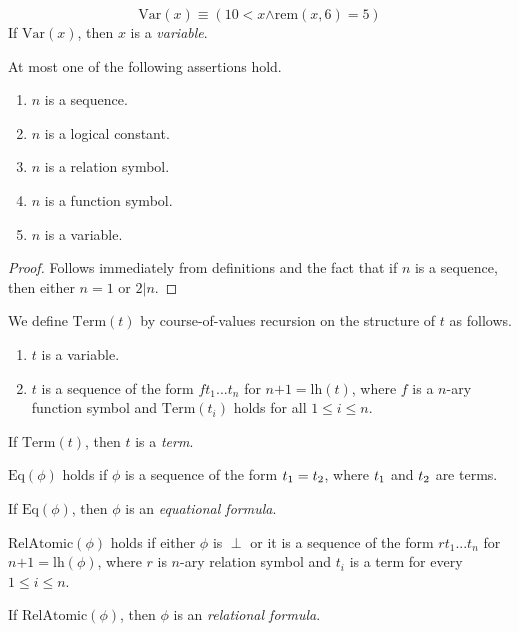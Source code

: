 \documentclass[10pt]{amsart}
\newcommand{\mand}{\boldsymbol{\wedge}}
\newcommand{\mle}{\boldsymbol{<}}
\newcommand{\mleq}{\boldsymbol{\leq}}
\newcommand{\meq}{\boldsymbol{=}}
\newcommand{\mplus}{\boldsymbol{+}}
\begin{document}
\begin{definition}
	$$\mathrm{Var}(x) \equiv \left(10 \mle x \mand \mathrm{rem}(x,6) \meq 5\right)$$
	If $\mathrm{Var}(x)$, then $x$ is a \textit{variable}.
\end{definition}

\begin{fact}\label{fact:signature_variables_parentheses_logical_symbols_and_sequences_are_pairwise_disjoint}
	At most one of the following assertions hold.
	\begin{enumerate}[label=\emph{\textbf{(\arabic*)}}, leftmargin=3.0em]
		\item $n$ is a sequence.
		\item $n$ is a logical constant.
		\item $n$ is a relation symbol.
		\item $n$ is a function symbol.
		\item $n$ is a variable.
	\end{enumerate}
\end{fact}
\begin{proof}
	Follows immediately from definitions and the fact that if $n$ is a sequence, then either $n \meq 1$ or $2|n$.
\end{proof}

\begin{definition}
	We define $\mathrm{Term}(t)$ by course-of-values recursion on the structure of $t$ as follows.
	\begin{enumerate}[label=\textbf{(\arabic*)}, leftmargin=3.0em]
		\item $t$ is a variable.
		\item $t$ is a sequence of the form $ft_1...t_n$ for $n \mplus 1 \meq \mathrm{lh}(t)$, where $f$ is a $n$-ary function symbol and $\mathrm{Term}(t_i)$ holds for all $1 \mleq i \mleq n$.
	\end{enumerate}
	If $\mathrm{Term}(t)$, then $t$ is a \textit{term}.
\end{definition}

\begin{definition}
	$\mathrm{Eq}(\phi)$ holds if $\phi$ is a sequence of the form $t_{\rm{1}}= t_{\rm{2}}$, where $t_{\rm{1}}$ and $t_{\rm{2}}$ are terms.

	If $\mathrm{Eq}(\phi)$, then $\phi$ is an \textit{equational formula}.
\end{definition}

\begin{definition}
	$\mathrm{RelAtomic}(\phi)$ holds if either $\phi$ is $\perp$ or it is a sequence of the form $rt_1...t_n$ for $n \mplus 1 \meq \mathrm{lh}(\phi)$, where $r$ is $n$-ary relation symbol and $t_i$ is a term for every $1 \mleq i \mleq n$.

	If $\mathrm{RelAtomic}(\phi)$, then $\phi$ is an \textit{relational formula}.
\end{definition}
\end{document}
